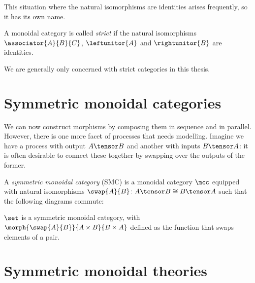 This situation where the natural isomorphisms are identities arises frequently,
so it has its own name.

\begin{definition}
    A monoidal category is called \emph{strict} if the natural isomorphisms \(
        \associator{A}{B}{C}
    \), \(
        \leftunitor{A}
    \) and \(
        \rightunitor{B}
    \) are identities.
\end{definition}

We are generally only concerned with strict categories in this thesis.

\section{Symmetric monoidal categories}

We can now construct morphisms by composing them in sequence and in parallel.
However, there is one more facet of processes that needs modelling.
Imagine we have a process with output \(A \tensor B\) and another with inputs
\(B \tensor A\): it is often desirable to connect these together by swapping
over the outputs of the former.

\begin{definition}
    \label{def:symmetric-monoidal-category}
    A \emph{symmetric monoidal category} (SMC) is a monoidal category \(\mcc\)
    equipped with natural isomorphisms \(
        \swap{A}{B} \colon A \tensor B \cong B \tensor A
    \) such that the following diagrams commute:
    \begin{center}
        
        

        \vspace{1em}

        
    \end{center}
\end{definition}

\begin{example}
    \(\set\) is a symmetric monoidal category, with \(
        \morph{\swap{A}{B}}{A \times B}{B \times A}
    \) defined as the function that swaps elements of a pair.
\end{example}

\section{Symmetric monoidal theories}


